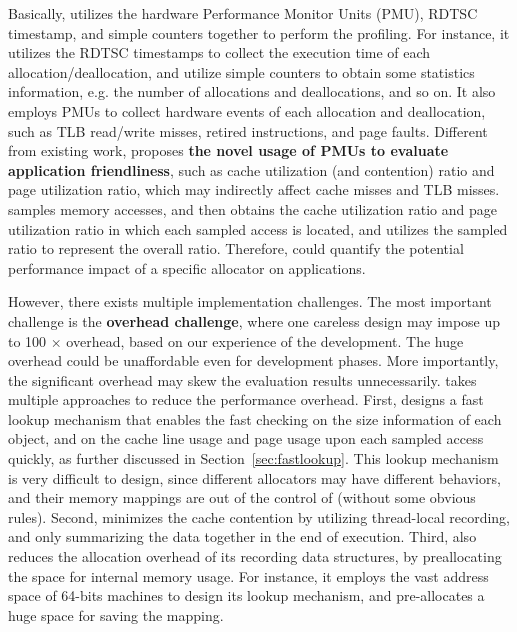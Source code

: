 Basically, \MP{} utilizes the hardware Performance Monitor Units (PMU), RDTSC timestamp, and simple counters together to perform the profiling. For instance, it utilizes the RDTSC timestamps to collect the execution time of each allocation/deallocation, and utilize simple counters to obtain some statistics information, e.g. the number of allocations and deallocations, and so on. It also employs PMUs to collect  hardware events of each allocation and deallocation, such as TLB read/write misses, retired instructions, and page faults. Different from existing work, \MP{} proposes \textbf{the novel usage of PMUs to evaluate application friendliness}, such as cache utilization (and contention) ratio and page utilization ratio, which may indirectly affect cache misses and TLB misses. \MP{} samples memory accesses, and then obtains the cache utilization ratio and page utilization ratio in which each sampled access is located, and utilizes the sampled ratio to represent the overall ratio. Therefore, \MP{} could quantify the potential performance impact of a specific allocator on applications.    

However, there exists multiple implementation challenges. The most important challenge is the \textbf{overhead challenge}, where one careless design may impose up to 100 $\times$ overhead, based on our experience of the development. The huge overhead could be unaffordable even for development phases. More importantly, the significant overhead may skew the evaluation results unnecessarily. \MP{} takes multiple approaches to reduce the performance overhead. First, \MP{} designs a fast lookup mechanism that enables the fast checking on the size information of each object, and on the cache line usage and page usage upon each sampled access quickly, as further discussed in Section~\ref{sec:fastlookup}. This lookup mechanism is very difficult to design, since different allocators may have different behaviors, and their memory mappings are out of the control of \MP{} (without some obvious rules). Second, \MP{} minimizes the cache contention by utilizing thread-local recording, and only summarizing the data together in the end of execution. Third, \MP{} also reduces the allocation overhead of its recording data structures, by preallocating the space for internal memory usage. For instance, it employs the vast address space of 64-bits machines to design its lookup mechanism, and pre-allocates a huge space for saving the mapping. 

